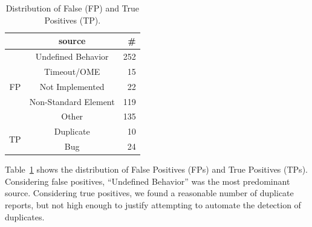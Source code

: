 \documentclass[sigconf,review, anonymous]{acmart}
\begin{document}
\begin{table}
  \vspace{-1ex}
  \small
  \centering
  \caption{\label{fig:falsepositives}\label{fig:truepositives}\label{fig:piecharts-transplantation}Distribution
    of False (FP) and True Positives (TP).}
  \setlength{\tabcolsep}{3pt}      
  \renewcommand*{\arraystretch}{0.9}
  \begin{tabular}{ccr}
    \toprule
    & source &  \#\\
    \midrule
    \multirow{5}{*}{FP} & Undefined Behavior & 252 \\
    & Timeout/OME & 15 \\
    & Not Implemented & 22 \\
    & Non-Standard Element & 119 \\
    & Other & 135 \\
    \midrule
    \multirow{2}{*}{TP} & Duplicate & 10 \\
    & Bug & 24 \\
    \bottomrule
  \end{tabular}
\end{table}
Table~\ref{fig:piecharts-transplantation} shows the distribution of
False Positives (FPs) and True Positives (TPs). Considering false
positives, ``Undefined Behavior'' was the most predominant
source. Considering true positives, we found a reasonable number of
duplicate reports, but not high enough to justify attempting to
automate the detection of duplicates.





\end{document}
